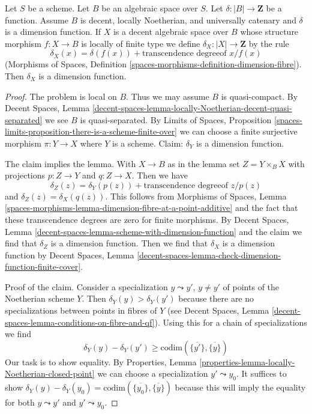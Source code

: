 \begin{lemma}
\label{lemma-universally-catenary-dimension-function}
Let $S$ be a scheme. Let $B$ be an algebraic space over $S$.
Let $\delta : |B| \to \mathbf{Z}$ be a function.
Assume $B$ is decent, locally Noetherian, and
universally catenary and $\delta$ is a dimension function.
If $X$ is a decent algebraic space over $B$ whose structure morphism
$f : X \to B$ is locally of finite type we define
$\delta_X : |X| \to \mathbf{Z}$ by the rule
$$
\delta_X(x) = \delta(f(x)) + \text{transcendence degreeof }x/f(x)
$$
(Morphisms of Spaces, Definition
\ref{spaces-morphisms-definition-dimension-fibre}).
Then $\delta_X$ is a dimension function.
\end{lemma}

\begin{proof}
The problem is local on $B$. Thus we may assume $B$ is quasi-compact.
By Decent Spaces, Lemma
\ref{decent-spaces-lemma-locally-Noetherian-decent-quasi-separated}
we see $B$ is quasi-separated. By
Limits of Spaces, Proposition
\ref{spaces-limits-proposition-there-is-a-scheme-finite-over}
we can choose a finite surjective morphism $\pi : Y \to X$
where $Y$ is a scheme.
Claim: $\delta_Y$ is a dimension function.

\medskip\noindent
The claim implies the lemma. With $X \to B$ as in the lemma
set $Z = Y \times_B X$ with projections $p : Z \to Y$ and $q : Z \to X$.
Then we have
$$
\delta_Z(z) = \delta_Y(p(z)) + \text{transcendence degreeof }z/p(z)
$$
and $\delta_Z(z) = \delta_X(q(z))$. This follows from
Morphisms of Spaces, Lemma 
\ref{spaces-morphisms-lemma-dimension-fibre-at-a-point-additive}
and the fact that these transcendence degrees are zero
for finite morphisms. By Decent Spaces, Lemma
\ref{decent-spaces-lemma-scheme-with-dimension-function}
and the claim we find that $\delta_Z$ is a dimension function.
Then we find that $\delta_X$ is a dimension function by
Decent Spaces, Lemma
\ref{decent-spaces-lemma-check-dimension-function-finite-cover}.

\medskip\noindent
Proof of the claim. Consider a specialization $y \leadsto y'$,
$y \not = y'$ of points of the Noetherian scheme $Y$.
Then $\delta_Y(y) > \delta_Y(y')$ because there are
no specializations between points in fibres of $Y$
(see Decent Spaces, Lemma
\ref{decent-spaces-lemma-conditions-on-fibre-and-qf}).
Using this for a chain of specializations we find
$$
\delta_Y(y) - \delta_Y(y') \geq
\text{codim}(\overline{\{y'\}}, \overline{\{y\}})
$$
Our task is to show equality. By
Properties, Lemma \ref{properties-lemma-locally-Noetherian-closed-point}
we can choose a specialization $y' \leadsto y_0$.
It suffices to show
$\delta_Y(y) - \delta_Y(y_0) =
\text{codim}(\overline{\{y_0\}}, \overline{\{y\}})$
because this will imply the equality for both
$y \leadsto y'$ and $y' \leadsto y_0$.


\end{proof}
